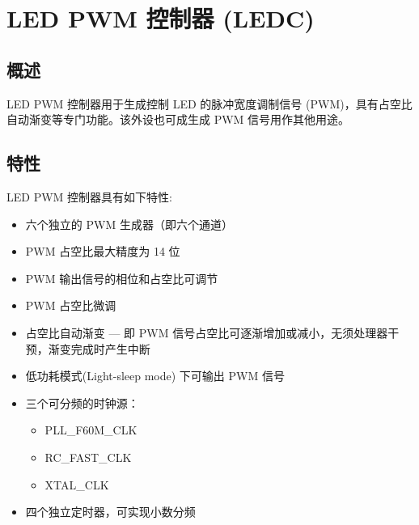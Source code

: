 \documentclass[main\_\_CN.tex]{subfiles}
\begin{document}

\ifglobal
\else
    {\let\clearpage\relax \listoftodos}
    {\let\clearpage\relax \listofdonetodos}
    \tableofcontents
\fi



\hypertarget{ledpwm}{}
\chapter{LED PWM 控制器 (LEDC)}
\label{mod:ledpwm}


\section{概述}

LED PWM 控制器用于生成控制 LED 的脉冲宽度调制信号 (PWM)，具有占空比自动渐变等专门功能。该外设也可成生成 PWM 信号用作其他用途。

\section{特性}
LED PWM 控制器具有如下特性:

\begin{itemize}
    \item 六个独立的 PWM 生成器（即六个通道）
    \item PWM 占空比最大精度为 14 位
    \item PWM 输出信号的相位和占空比可调节
    \item PWM 占空比微调
    \item 占空比自动渐变 — 即 PWM 信号占空比可逐渐增加或减小，无须处理器干预，渐变完成时产生中断
    \item 低功耗模式(Light-sleep mode) 下可输出 PWM 信号
    \item 三个可分频的时钟源：
        \begin{itemize}
            \item PLL\_F60M\_CLK
            \item RC\_FAST\_CLK
            \item XTAL\_CLK
        \end{itemize}
    \item 四个独立定时器，可实现小数分频
\end{itemize}
\end{document}
